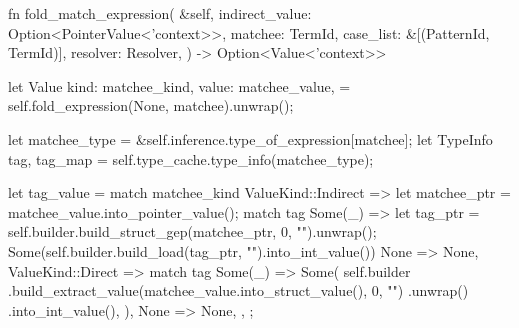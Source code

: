 \documentclass[
  oneside,
  english,
  coorientadorbanca,
  noabntexcite
]{ufsc-thesis-rn46-2019}
\begin{document}
\begin{rustcode}
{    fn fold_match_expression(
        &self,
        indirect_value: Option<PointerValue<'context>>,
        matchee: TermId,
        case_list: &[(PatternId, TermId)],
        resolver: Resolver,
    ) -> Option<Value<'context>> {
        let Value {
            kind: matchee_kind,
            value: matchee_value,
        } = self.fold_expression(None, matchee).unwrap();

        let matchee_type = &self.inference.type_of_expression[matchee];
        let TypeInfo { tag, tag_map } = self.type_cache.type_info(matchee_type);

        let tag_value = match matchee_kind {
            ValueKind::Indirect => {
                let matchee_ptr = matchee_value.into_pointer_value();
                match tag {
                    Some(_) => {
                        let tag_ptr = self.builder.build_struct_gep(matchee_ptr, 0, "").unwrap();
                        Some(self.builder.build_load(tag_ptr, "").into_int_value())
                    }
                    None => None,
                }
            }
            ValueKind::Direct => match tag {
                Some(_) => Some(
                    self.builder
                        .build_extract_value(matchee_value.into_struct_value(), 0, "")
                        .unwrap()
                        .into_int_value(),
                ),
                None => None,
            },
        };

}}
\end{rustcode}
\end{document}
